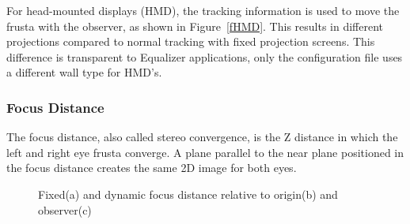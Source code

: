 \documentclass[10pt,a4]{scrartcl}
\newcommand{\fig}[1]{Figure~\ref{#1}}
\begin{document}
For head-mounted displays (HMD), the tracking information is used to move the
frusta with the observer, as shown in \fig{fHMD}. This results in different
projections compared to normal tracking with fixed projection screens. This
difference is transparent to Equalizer applications, only the configuration file
uses a different wall type for HMD's.

\subsubsection{\label{sFocusDistance}Focus Distance}

The focus distance, also called stereo convergence, is the Z distance in which
the left and right eye frusta converge. A plane parallel to the near plane
positioned in the focus distance creates the same 2D image for both eyes.

\begin{figure}
  \hfil
  \hfil
  {\caption{Fixed(a) and dynamic focus distance relative to origin(b) and observer(c)}}
\end{figure}
\end{document}
